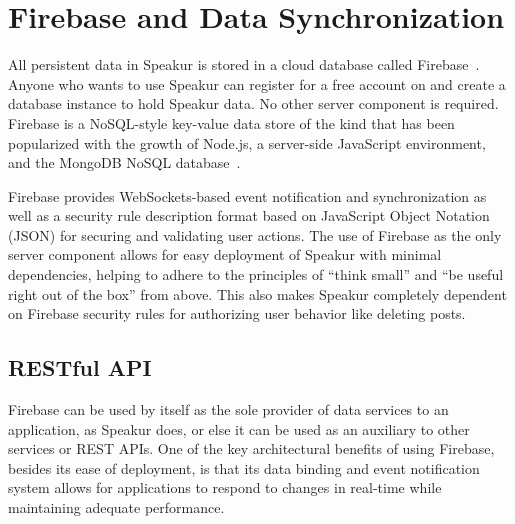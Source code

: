 \section{Firebase and Data Synchronization}
All persistent data in Speakur is stored in a cloud database called Firebase~\cite{firebasecontributors2015}.
Anyone who wants to use Speakur can register for a free account on  and create a database instance to hold Speakur data.
No other server component is required.
Firebase is a NoSQL-style key-value data store of the kind that has been popularized
with the growth of 
Node.js, a server-side JavaScript environment,
and the MongoDB NoSQL database~\cite{dickey2014}.

Firebase provides WebSockets-based event notification and synchronization 
as well as a security rule description format based on 
JavaScript Object Notation (JSON)
for securing and validating user actions.
The use of Firebase as the only server component allows for easy deployment of Speakur with minimal dependencies, helping to adhere to the principles of ``think small'' and ``be useful right out of the box'' from above.
This also makes Speakur completely dependent on Firebase security rules for authorizing user behavior like deleting posts.

\subsection{RESTful API}
Firebase can be used by itself as the sole provider of data services to an application, as Speakur does, or else it can be used as an auxiliary to other services or REST APIs.
One of the key architectural benefits of using Firebase, 
besides its ease of deployment, 
is that its data binding and event notification system allows for 
applications to respond to changes in real-time while maintaining adequate performance.


